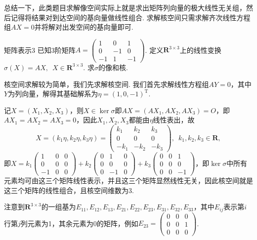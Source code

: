 总结一下，此类题目求解像空间实际上就是求出矩阵列向量的极大线性无关组，然后记得将结果对到达空间的基向量做线性组合. 求解核空间只需求解齐次线性方程组$AX=0$并将解对出发空间的基向量即可.

\begin{example}{}{矩阵表示3}
    已知3阶矩阵$A=\begin{pmatrix}
            1 & 0 & 1 \\ 0 & -1 & 0 \\ -1 & 1 & -1
        \end{pmatrix}$. 定义$\mathbf{R}^{3 \times 3}$上的线性变换$\sigma(X)=AX,\enspace X \in \mathbf{R}^{3 \times 3}$. 求$\sigma$的像和核.
\end{example}

\begin{solution}
    核空间求解较为简单，我们先求解核空间. 我们首先求解线性方程组$AY=0$，其中$Y$为列向量，解得其基础解系为$\eta=(1,0,-1)^\mathrm{T}$.

    记$X=(X_1,X_2,X_3)$，则$X\in\ker\sigma$即$AX=(AX_1,AX_2,AX_3)=O$，即$AX_1=AX_2=AX_3=0$，因此$X_1,X_2,X_3$都能由$\eta$线性表出，故
    \[X=(k_1\eta,k_2\eta,k_3\eta)=\begin{pmatrix}
            k_1 & k_2 & k_3 \\ 0 & 0 & 0 \\ -k_1 & -k_2 & -k_3
        \end{pmatrix},\enspace k_1,k_2,k_3\in\mathbf{R},\]
    即$X=k_1\begin{pmatrix}
            1 & 0 & 0 \\ 0 & 0 & 0 \\ -1 & 0 & 0
        \end{pmatrix}+k_2\begin{pmatrix}
            0 & 1 & 0 \\ 0 & 0 & 0 \\ 0 & -1 & 0
        \end{pmatrix}+k_3\begin{pmatrix}
            0 & 0 & 1 \\ 0 & 0 & 0 \\ 0 & 0 & -1
        \end{pmatrix}$，即$\ker\sigma$中所有元素均可由这三个矩阵线性表示，并且这三个矩阵显然线性无关，因此核空间就是这三个矩阵的线性组合，且核空间维数为3.

    注意到$\mathbf{R}^{3 \times 3}$的一组基为$E_{11},E_{12},E_{13},E_{21},E_{22},E_{23},E_{31},E_{32},E_{33}$，其中$E_{ij}$表示第$i$行第$j$列元素为1，其余元素为0的矩阵，例如$E_{23}=\begin{pmatrix}
            0 & 0 & 0 \\ 0 & 0 & 1 \\ 0 & 0 & 0
        \end{pmatrix}$.


\end{solution}
